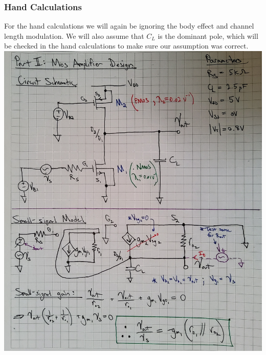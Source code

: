 \documentclass[12pt, fleqn]{article}
\begin{document}
\subsubsection{Hand Calculations}
For the hand calculations we will again be ignoring the body effect and channel length modulation.  We will also assume that $C_L$ is the dominant pole, which will be checked in the hand calculations to make sure our assumption was correct.\\[0.25cm]
\includegraphics[scale=0.155, angle=90, center]{p2a_1.jpg}\\
\newpage
\end{document}
